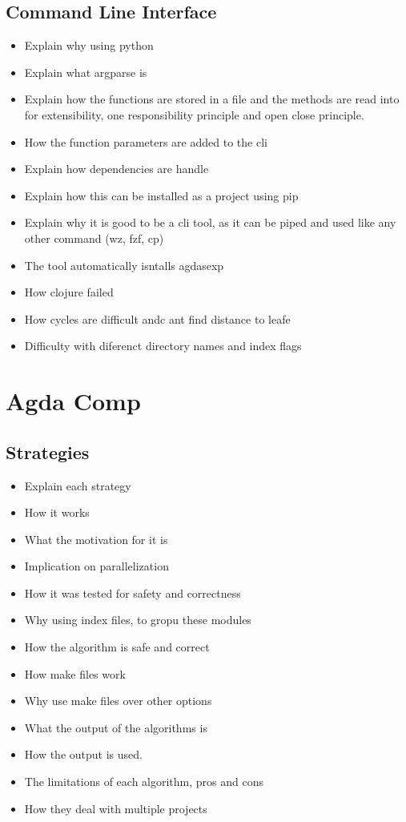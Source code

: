 \subsection{Command Line Interface}\label{sub:Agda Tree CLI}

\begin{itemize}
\item Explain why using python
\item Explain what argparse is 
\item Explain how the functions are stored in a file and the methods are read into for extensibility, one responsibility principle and open close principle.
\item How the function parameters are added to the cli 
\item Explain how dependencies are handle 
\item Explain how this can be installed as a project using pip 
\item Explain why it is good to be a cli tool, as it can be piped and used like any other command (wz, fzf, cp) 
\item The tool automatically isntalls agdasexp 
\item How clojure failed 
\item How cycles are difficult andc ant find distance to leafe 
\item Difficulty with diferenct directory names and index flags
\end{itemize}

\section{Agda Comp}

\subsection{Strategies}

\begin{itemize}
\item Explain each strategy 
\item How it works 
\item What the motivation for it is 
\item Implication on parallelization 
\item How it was tested for safety and correctness 
\item Why using index files, to gropu these modules 
\item How the algorithm is safe and correct 
\item How make files work 
\item Why use make files over other options 
\item What the output of the algorithms is 
\item How the output is used. 
\item The limitations of each algorithm, pros and cons 
\item How they deal with multiple projects
\end{itemize}

